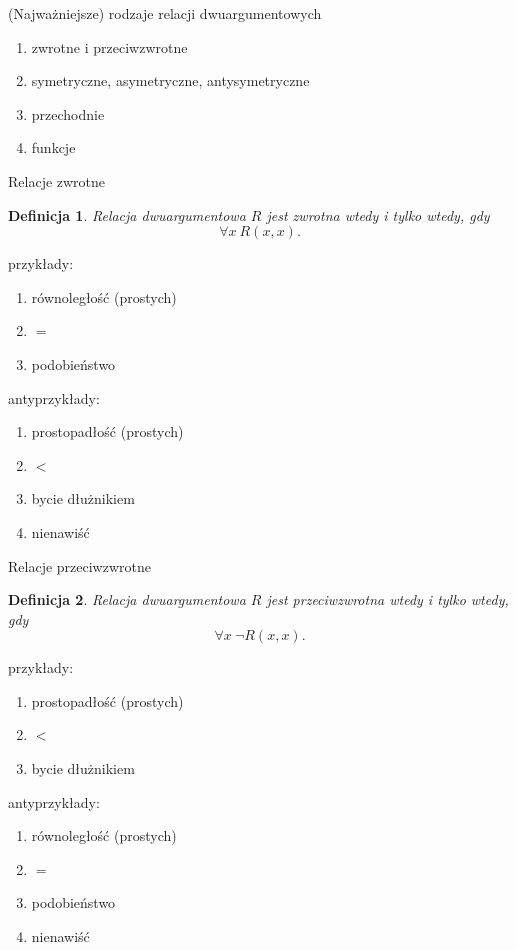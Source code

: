 \documentclass{beamer}
\newtheorem{definicja}{Definicja}
\begin{document}
\begin{frame}{(Najważniejsze) rodzaje relacji dwuargumentowych}
%
\begin{enumerate}
\item zwrotne i przeciwzwrotne
\item symetryczne, asymetryczne, antysymetryczne
\item przechodnie
\item funkcje
\end{enumerate}
\end{frame}

\begin{frame}{Relacje zwrotne}
%
\begin{definicja}
Relacja dwuargumentowa $R$ jest \emph{zwrotna} wtedy i tylko wtedy, gdy $$\forall x ~R(x,x).$$
\end{definicja}
%
przykłady:
\begin{enumerate}
\item równoległość (prostych)
\item $=$
\item podobieństwo
\end{enumerate}
%
antyprzykłady:
\begin{enumerate}
\item prostopadłość (prostych)
\item $<$
\item bycie dłużnikiem
\item nienawiść
\end{enumerate}
\end{frame}

\begin{frame}{Relacje przeciwzwrotne}
%
\begin{definicja}
Relacja dwuargumentowa $R$ jest \emph{przeciwzwrotna} wtedy i tylko wtedy, gdy $$\forall x ~\neg R(x,x).$$
\end{definicja}
%
przykłady:
\begin{enumerate}
\item prostopadłość (prostych)
\item $<$
\item bycie dłużnikiem
\end{enumerate}
antyprzykłady:
\begin{enumerate}
\item równoległość (prostych)
\item $=$
\item podobieństwo
\item nienawiść
\end{enumerate}
\end{frame}
\end{document}
